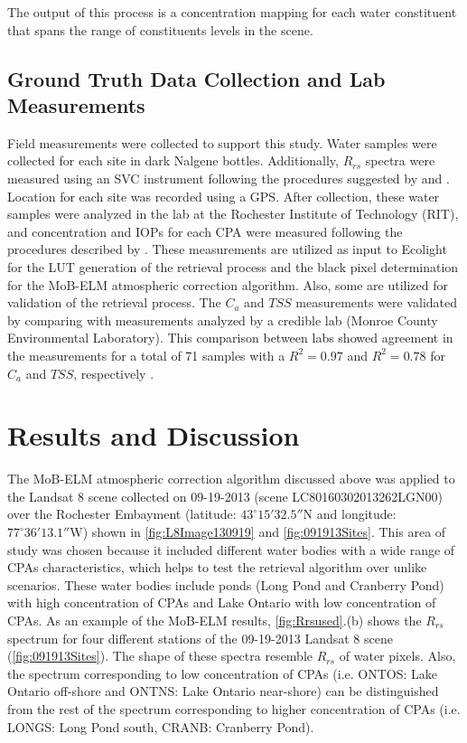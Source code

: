 \documentclass[onecolumn,3p,letterpaper,11pt]{elsarticle}
\begin{document}
The output of this process is a concentration mapping for each water constituent that spans the range of constituents levels in the scene. 

\subsection{Ground Truth Data Collection and Lab Measurements}
\label{subsec:FieldLabMea}

Field measurements were collected to support this study. Water samples were collected for each site in dark Nalgene bottles. Additionally, $R_{rs}$ spectra were measured using an SVC instrument \citep{SVCHR1024i} following the procedures suggested by \citet{Mobley:1999} and \citet{Mueller1995}. Location for each site was recorded using a GPS. After collection, these water samples were analyzed in the lab at the Rochester Institute of Technology (RIT), and concentration and IOPs for each CPA were measured following the procedures described by \citet{Mitchell2002}. These measurements are utilized as input to Ecolight for the LUT generation of the retrieval process and the black pixel determination for the MoB-ELM atmospheric correction algorithm. Also, some are utilized for validation of the retrieval process. The $C_a$ and $TSS$ measurements were validated by comparing with measurements analyzed by a credible lab (Monroe County Environmental Laboratory). This comparison between labs showed agreement in the measurements for a total of 71 samples with a $R^2=0.97$ and $R^2=0.78$ for $C_a$ and $TSS$, respectively \citep{ConchaThesis2015}.

\section{Results and Discussion}
\label{sec:Results}

The MoB-ELM atmospheric correction algorithm discussed above was applied to the Landsat 8 scene collected on 09-19-2013 (scene LC80160302013262LGN00) over the Rochester Embayment (latitude: $43^\circ15'32.5''$N and longitude: $77^\circ36'13.1''$W) shown in \autoref{fig:L8Image130919} and \autoref{fig:091913Sites}. This area of study was chosen because it included different water bodies with a wide range of CPAs characteristics, which helps to test the retrieval algorithm over unlike scenarios. These water bodies include ponds (Long Pond and Cranberry Pond) with high concentration of CPAs and Lake Ontario with low concentration of CPAs. As an example of the MoB-ELM results, \autoref{fig:Rrsused}.(b) shows the $R_{rs}$ spectrum for four different stations of the 09-19-2013 Landsat 8 scene (\autoref{fig:091913Sites}). The shape of these spectra resemble $R_{rs}$ of water pixels. Also, the spectrum corresponding to low concentration of CPAs (i.e. ONTOS: Lake Ontario off-shore and ONTNS: Lake Ontario near-shore) can be distinguished from the rest of the spectrum corresponding to higher concentration of CPAs (i.e. LONGS: Long Pond south, CRANB: Cranberry Pond).
\end{document}
